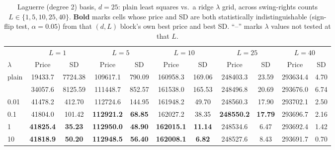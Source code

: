 \begin{table}[htbp]
\caption{\label{tab:laguerre_ridge_lambda_L_sweep_d25}Laguerre (degree 2) basis, $d=25$: plain least squares vs.\ a ridge $\lambda$ grid, across swing-rights counts $L \in \{1,5,10,25,40\}$. \textbf{Bold} marks cells whose price and SD are both statistically indistinguishable (sign-flip test, $\alpha=0.05$) from that $(d,L)$ block's own best price and best SD. ``--'' marks $\lambda$ values not tested at that $L$.}
\scriptsize
\setlength{\tabcolsep}{3pt}
\centering
\begin{tabular}[t]{lcccccccccc}
\toprule
\multicolumn{1}{c}{ } & \multicolumn{2}{c}{$L = 1$} & \multicolumn{2}{c}{$L = 5$} & \multicolumn{2}{c}{$L = 10$} & \multicolumn{2}{c}{$L = 25$} & \multicolumn{2}{c}{$L = 40$} \\
\cmidrule(l{3pt}r{3pt}){2-3} \cmidrule(l{3pt}r{3pt}){4-5} \cmidrule(l{3pt}r{3pt}){6-7} \cmidrule(l{3pt}r{3pt}){8-9} \cmidrule(l{3pt}r{3pt}){10-11}
$\lambda$ & Price & SD & Price & SD & Price & SD & Price & SD & Price & SD\\
\midrule
plain & 19433.7 & 7724.38 & 109617.1 & 790.09 & 160958.3 & 169.06 & 248403.3 & 23.59 & 293634.4 & 4.70\\
\addlinespace
0.001 & 34057.6 & 8125.59 & 111448.7 & 852.57 & 161538.0 & 165.53 & 248496.8 & 20.69 & 293676.0 & 6.74\\
0.01 & 41478.2 & 412.70 & 112724.6 & 144.95 & 161948.2 & 49.70 & 248560.3 & 17.90 & 293702.1 & 2.50\\
0.1 & 41804.0 & 101.42 & \textbf{112921.2} & \textbf{68.85} & 162027.2 & 38.35 & \textbf{248550.2} & \textbf{17.79} & 293696.7 & 2.16\\
1 & \textbf{41825.4} & \textbf{35.23} & \textbf{112950.0} & \textbf{48.90} & \textbf{162015.1} & \textbf{11.14} & 248534.6 & 6.47 & 293692.4 & 1.42\\
10 & \textbf{41818.9} & \textbf{50.20} & \textbf{112948.5} & \textbf{56.40} & \textbf{162008.1} & \textbf{6.82} & 248527.6 & 8.43 & 293691.7 & 0.70\\
\bottomrule
\end{tabular}
\end{table}

